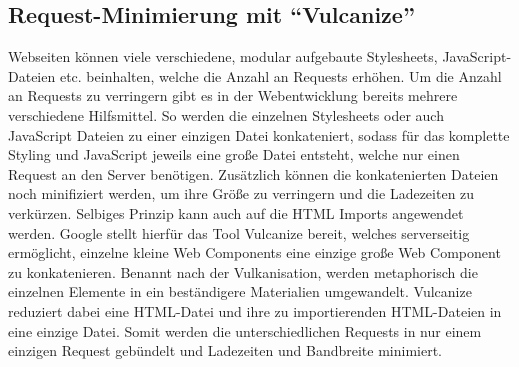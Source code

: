 \subsection{\texorpdfstring{Request-Minimierung mit ``Vulcanize''}{Request-Minimierung mit Vulcanize}}\label{request-minimierung-mit-vulcanize}

Webseiten können viele verschiedene, modular aufgebaute Stylesheets, JavaScript-Dateien etc. beinhalten, welche die Anzahl an Requests erhöhen. Um die Anzahl an Requests zu verringern gibt es in der Webentwicklung bereits mehrere verschiedene Hilfsmittel. So werden die einzelnen Stylesheets oder auch JavaScript Dateien zu einer einzigen Datei konkateniert, sodass für das komplette Styling und JavaScript jeweils eine große Datei entsteht, welche nur einen Request an den Server benötigen. Zusätzlich können die konkatenierten Dateien noch minifiziert werden, um ihre Größe zu verringern und die Ladezeiten zu verkürzen. Selbiges Prinzip kann auch auf die \ac{HTML} Imports angewendet werden. Google stellt hierfür das Tool Vulcanize \cite{citeulike:13879681} bereit, welches serverseitig ermöglicht, einzelne kleine Web Components eine einzige große Web Component zu konkatenieren. Benannt nach der Vulkanisation, werden metaphorisch die einzelnen Elemente in ein beständigere Materialien umgewandelt. Vulcanize reduziert dabei eine \ac{HTML}-Datei und ihre zu importierenden \ac{HTML}-Dateien in eine einzige Datei. Somit werden die unterschiedlichen Requests in nur einem einzigen Request gebündelt und Ladezeiten und Bandbreite minimiert.


